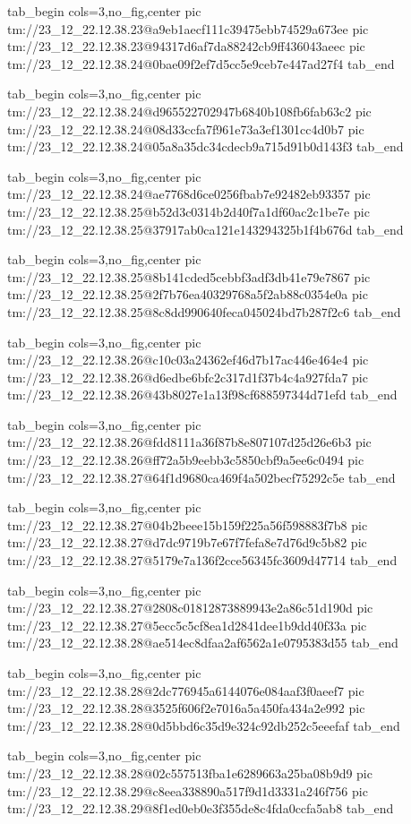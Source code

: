 \ifcmt
  tab_begin cols=3,no_fig,center
    pic tm://23_12_22.12.38.23@a9eb1aecf111c39475ebb74529a673ee
    pic tm://23_12_22.12.38.23@94317d6af7da88242cb9ff436043aeec
    pic tm://23_12_22.12.38.24@0bae09f2ef7d5cc5e9ceb7e447ad27f4
  tab_end
\fi


\ifcmt
  tab_begin cols=3,no_fig,center
    pic tm://23_12_22.12.38.24@d965522702947b6840b108fb6fab63c2
    pic tm://23_12_22.12.38.24@08d33ccfa7f961e73a3ef1301cc4d0b7
    pic tm://23_12_22.12.38.24@05a8a35dc34cdecb9a715d91b0d143f3
  tab_end
\fi


\ifcmt
  tab_begin cols=3,no_fig,center
    pic tm://23_12_22.12.38.24@ae7768d6ce0256fbab7e92482eb93357
    pic tm://23_12_22.12.38.25@b52d3c0314b2d40f7a1df60ac2c1be7e
    pic tm://23_12_22.12.38.25@37917ab0ca121e143294325b1f4b676d
  tab_end
\fi


\ifcmt
  tab_begin cols=3,no_fig,center
    pic tm://23_12_22.12.38.25@8b141cded5cebbf3adf3db41e79e7867
    pic tm://23_12_22.12.38.25@2f7b76ea40329768a5f2ab88c0354e0a
    pic tm://23_12_22.12.38.25@8c8dd990640feca045024bd7b287f2c6
  tab_end
\fi


\ifcmt
  tab_begin cols=3,no_fig,center
    pic tm://23_12_22.12.38.26@c10c03a24362ef46d7b17ac446e464e4
    pic tm://23_12_22.12.38.26@d6edbe6bfc2c317d1f37b4c4a927fda7
    pic tm://23_12_22.12.38.26@43b8027e1a13f98cf688597344d71efd
  tab_end
\fi


\ifcmt
  tab_begin cols=3,no_fig,center
    pic tm://23_12_22.12.38.26@fdd8111a36f87b8e807107d25d26e6b3
    pic tm://23_12_22.12.38.26@ff72a5b9eebb3c5850cbf9a5ee6c0494
    pic tm://23_12_22.12.38.27@64f1d9680ca469f4a502becf75292c5e
  tab_end
\fi


\ifcmt
  tab_begin cols=3,no_fig,center
    pic tm://23_12_22.12.38.27@04b2beee15b159f225a56f598883f7b8
    pic tm://23_12_22.12.38.27@d7dc9719b7e67f7fefa8e7d76d9c5b82
    pic tm://23_12_22.12.38.27@5179e7a136f2cce56345fc3609d47714
  tab_end
\fi


\ifcmt
  tab_begin cols=3,no_fig,center
    pic tm://23_12_22.12.38.27@2808c01812873889943e2a86c51d190d
    pic tm://23_12_22.12.38.27@5ecc5c5cf8ea1d2841dee1b9dd40f33a
    pic tm://23_12_22.12.38.28@ae514ec8dfaa2af6562a1e0795383d55
  tab_end
\fi


\ifcmt
  tab_begin cols=3,no_fig,center
    pic tm://23_12_22.12.38.28@2dc776945a6144076e084aaf3f0aeef7
    pic tm://23_12_22.12.38.28@3525f606f2e7016a5a450fa434a2e992
    pic tm://23_12_22.12.38.28@0d5bbd6c35d9e324c92db252c5eeefaf
  tab_end
\fi


\ifcmt
  tab_begin cols=3,no_fig,center
    pic tm://23_12_22.12.38.28@02c557513fba1e6289663a25ba08b9d9
    pic tm://23_12_22.12.38.29@c8eea338890a517f9d1d3331a246f756
    pic tm://23_12_22.12.38.29@8f1ed0eb0e3f355de8c4fda0ccfa5ab8
  tab_end
\fi


